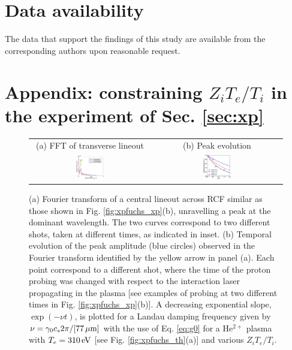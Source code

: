 \documentclass[
 reprint,
 superscriptaddress,
 amsmath,amssymb,
 aps,
]{revtex4-1}
\def\tc{\textcolor{red}}
\begin{document}
\section*{Data availability}
The data that support the findings of this study are available from the corresponding authors upon reasonable request.

\appendix
\section*{Appendix:  constraining $Z_iT_e/T_i$ in the experiment of Sec. \ref{sec:xp}}
\label{sec:ztesti}
\begin{figure}
\begin{tabular}{cc}
(a) FFT of transverse lineout&
(b) Peak evolution\\
\includegraphics[width=0.24\textwidth]{fucshsfft.eps}& 
\includegraphics[width=0.22\textwidth]{fuchsztesti_new.eps}
\end{tabular}
\caption{ \label{fig:xpfuchs_ap}  
(a) Fourier transform of a central lineout across RCF similar as those shown in Fig. \ref{fig:xpfuchs_xp}(b), unravelling a peak at the dominant wavelength. The two curves correspond to two different shots, taken at different times, as indicated in inset.
(b) Temporal evolution of the peak amplitude (blue circles) observed in the Fourier transform identified by the yellow arrow in panel (a). Each point correspond to a different shot, where the time of the proton probing was changed with respect to the interaction laser propagating in the plasma [see examples of probing at two different times in  Fig. \ref{fig:xpfuchs_xp}(b)]. A decreasing exponential slope,  $\exp(-\nu t)$, is plotted for a Landau damping frequency given by $\nu=\gamma_0c_s2\pi/[77\,\rm\mu m]$ with the use of  Eq. \eqref{eq:g0} for a He$^{2+}$ plasma with \tc{$T_e=310\,\rm eV$} [see Fig. \ref{fig:xpfuchs_th}(a)] and various $Z_iT_e/T_i$.
}
\end{figure}
\end{document}

